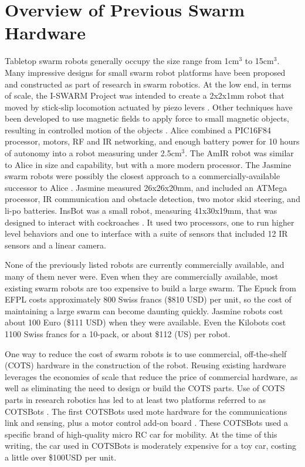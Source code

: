 \documentclass[letterpaper, 10 pt, conference]{ieeeconf}  %
\begin{document}
\section{Overview of Previous Swarm Hardware}

Tabletop swarm robots generally occupy the size range from 1cm$^3$ to 15cm$^3$.
Many impressive designs for small swarm robot platforms have been proposed and constructed as part of research in swarm robotics. 
At the low end, in terms of scale, the I-SWARM Project was intended to create a 2x2x1mm robot that moved by stick-slip locomotion actuated by piezo levers \cite{seyfried2005swarm}. 
Other techniques have been developed to use magnetic fields to apply force to small magnetic objects, resulting in controlled motion of the objects \cite{pelrine2012diamagnetically}.
Alice \cite{caprari1998autonomous} combined a PIC16F84 processor, motors, RF and IR networking, and enough battery power for 10 hours of autonomy into a robot measuring under 2.5cm$^3$. 
The AmIR robot was similar to Alice in size and capability, but with a more modern processor\cite{arvin2009development}.
The Jasmine swarm robots were possibly the closest approach to a commercially-available successor to Alice \cite{kernbach2011swarmrobot}.
Jasmine measured 26x26x20mm, and included an ATMega processor, IR communication and obstacle detection, two motor skid steering, and li-po batteries.
InsBot was a small robot, measuring 41x30x19mm, that was designed to interact with cockroaches \cite{colot2004insbot}.
It used two processors, one to run higher level behaviors and one to interface with a suite of sensors that included 12 IR sensors and a linear camera. 

None of the previously listed robots are currently commercially available, and many of them never were. 
Even when they are commercially available, most existing swarm robots are too expensive to build a large swarm.
The Epuck from EFPL costs approximately 800 Swiss francs (\$810 USD) per unit, so the cost of maintaining a large swarm can become daunting quickly. 
Jasmine robots cost about 100 Euro (\$111 USD) when they were available. 
Even the Kilobots \cite{rubenstein2014kilobot} cost 1100 Swiss francs for a 10-pack, or about \$112 (US) per robot. 

One way to reduce the cost of swarm robots is to use commercial, off-the-shelf (COTS) hardware in the construction of the robot. 
Reusing existing hardware leverages the economies of scale that reduce the price of commercial hardware, as well as eliminating the need to design or build the COTS parts. 
Use of COTS parts in research robotics has led to at least two platforms referred to as COTSBots \cite{bergbreiter2003cotsbots, soule2011cotsbots}.
The first COTSBots used mote hardware for the communications link and sensing, plus a motor control add-on board \cite{bergbreiter2003cotsbots}. 
These COTSBots used a specific brand of high-quality micro RC car for mobility.
At the time of this writing, the car used in COTSBots is moderately expensive for a toy car, costing a little over \$100USD per unit. 
 
\end{document}
